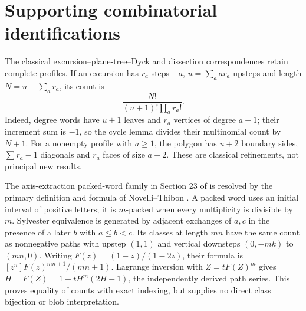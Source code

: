 \section{Supporting combinatorial identifications}
The classical excursion--plane-tree--Dyck and dissection correspondences \cite{HacklEtAl,BrakEtAl,CurienKortchemski} retain complete profiles. If an excursion has $r_a$ steps $-a$, $u=\sum_a ar_a$ upsteps and length $N=u+\sum_a r_a$, its count is
\[
\frac{N!}{(u+1)!\prod_a r_a!}.
\]
Indeed, degree words have $u+1$ leaves and $r_a$ vertices of degree $a+1$; their increment sum is $-1$, so the cycle lemma divides their multinomial count by $N+1$. For a nonempty profile with $a\ge1$, the polygon has $u+2$ boundary sides, $\sum r_a-1$ diagonals and $r_a$ faces of size $a+2$. These are classical refinements, not principal new results.

The axis-extraction packed-word family in Section 23 of \cite{Ham2019} is resolved by the primary definition and formula of Novelli--Thibon \cite[Section 5.3, (182)]{NovelliThibon}. A packed word uses an initial interval of positive letters; it is $m$-packed when every multiplicity is divisible by $m$. Sylvester equivalence is generated by adjacent exchanges of $a,c$ in the presence of a later $b$ with $a\le b<c$. Its classes at length $mn$ have the same count as nonnegative paths with upstep $(1,1)$ and vertical downsteps $(0,-mk)$ to $(mn,0)$. Writing $F(z)=(1-z)/(1-2z)$, their formula is $[z^n]F(z)^{mn+1}/(mn+1)$. Lagrange inversion with $Z=tF(Z)^m$ gives $H=F(Z)=1+tH^m(2H-1)$, the independently derived path series. This proves equality of counts with exact indexing, but supplies no direct class bijection or blob interpretation.

